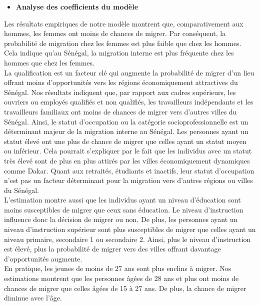 \documentclass[a4paper,12pt]{article}
\begin{document}
\begin{itemize}
	\item \textbf{Analyse des coefficients du modèle} 
\end{itemize}



Les résultats empiriques de notre modèle montrent que, comparativement aux hommes, les femmes ont moins de chances de migrer. Par conséquent, la probabilité de migration chez les femmes est plus faible que chez les hommes. Cela indique qu'au Sénégal, la migration interne est plus fréquente chez les hommes que chez les femmes.\\


La qualification est un facteur clé qui augmente la probabilité de migrer d'un lieu offrant moins d'opportunités vers les régions économiquement attractives du Sénégal. Nos résultats indiquent que, par rapport aux cadres supérieurs, les ouvriers ou employés qualifiés et non qualifiés, les travailleurs indépendants et les travailleurs familiaux ont moins de chances de migrer vers d'autres villes du Sénégal. Ainsi, le statut d'occupation ou la catégorie socioprofessionnelle est un déterminant majeur de la migration interne au Sénégal. Les personnes ayant un statut élevé ont une plus de chance de migrer que celles ayant un statut moyen ou inférieur. Cela pourrait s'expliquer par le fait que les individus avec un statut très élevé sont de plus en plus attirés par les villes économiquement dynamiques comme Dakar. Quant aux retraités, étudiants et inactifs, leur statut d'occupation n'est pas un facteur déterminant pour la migration vers d'autres régions ou villes du Sénégal. \\


L'estimation montre aussi que les individus ayant un niveau d'éducation sont moins susceptibles de migrer que ceux sans éducation. Le niveau d'instruction influence donc la décision de migrer ou non. De plus, les personnes ayant un niveau d'instruction supérieur sont plus susceptibles de migrer que celles ayant un niveau primaire, secondaire 1 ou secondaire 2. Ainsi, plus le niveau d'instruction est élevé, plus la probabilité de migrer vers des villes offrant davantage d'opportunités augmente. \\


En pratique, les jeunes de moins de 27 ans sont plus enclins à migrer. Nos estimations montrent que les personnes âgées de 28 ans et plus ont moins de chances de migrer que celles âgées de 15 à 27 ans. De plus, la chance de migrer diminue avec l'âge. \\
\end{document}
